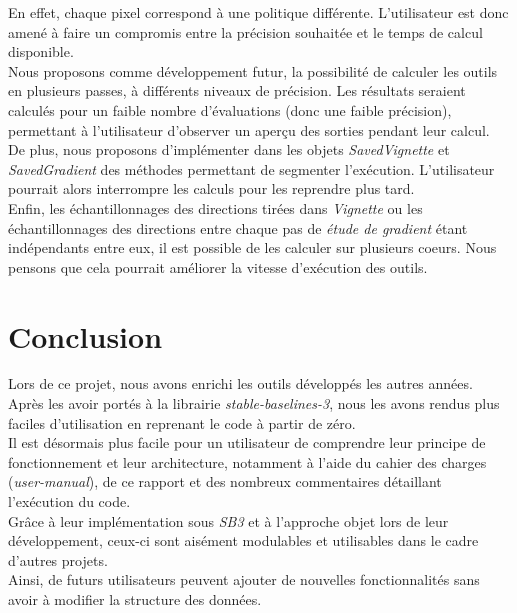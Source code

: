 \documentclass[12pt]{article}
\begin{document}
En effet, chaque pixel correspond à une politique différente. L'utilisateur est donc amené à faire un compromis entre la précision souhaitée et le temps de calcul disponible. \\

Nous proposons comme développement futur, la possibilité de calculer les outils en plusieurs passes, à différents niveaux de précision. Les résultats seraient calculés pour un faible nombre d'évaluations (donc une faible précision), permettant à l'utilisateur d'observer un aperçu des sorties pendant leur calcul. \\

De plus, nous proposons d'implémenter dans les objets \emph{SavedVignette} et \emph{SavedGradient} des méthodes permettant de segmenter l'exécution. L'utilisateur pourrait alors interrompre les calculs pour les reprendre plus tard. \\

Enfin, les échantillonnages des directions tirées dans \emph{Vignette} ou les échantillonnages des directions entre chaque pas de \emph{étude de gradient} étant indépendants entre eux, il est possible de les calculer sur plusieurs coeurs. Nous pensons que cela pourrait améliorer la vitesse d'exécution des outils. \\

\newpage
\section*{Conclusion}

Lors de ce projet, nous avons enrichi les outils développés les autres années. Après les avoir portés à la librairie \emph{stable-baselines-3}, nous les avons rendus plus faciles d'utilisation en reprenant le code à partir de zéro. \\

Il est désormais plus facile pour un utilisateur de comprendre leur principe de fonctionnement et leur architecture, notamment à l'aide du cahier des charges (\emph{user-manual}), de ce rapport et des nombreux commentaires détaillant l'exécution du code. \\

Grâce à leur implémentation sous \emph{SB3} et à l'approche objet lors de leur développement, ceux-ci sont aisément modulables et utilisables dans le cadre d'autres projets. \\

Ainsi, de futurs utilisateurs peuvent ajouter de nouvelles fonctionnalités sans avoir à modifier la structure des données. \\
\end{document}
